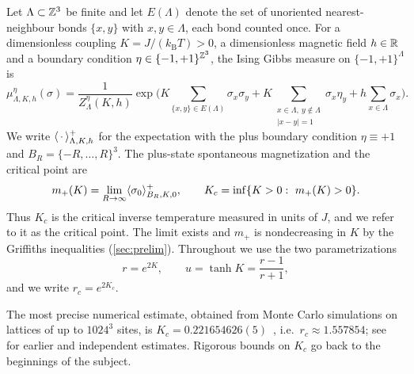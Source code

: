 Let $\Lambda\subset\mathbb Z^3$ be finite and let $E(\Lambda)$ denote the set of unoriented nearest-neighbour bonds $\{x,y\}$ with $x,y\in\Lambda$, each bond counted once. For a dimensionless coupling $K=J/(k_{\mathrm B}T)>0$, a dimensionless magnetic field $h\in\mathbb R$ and a boundary condition $\eta\in\{-1,+1\}^{\mathbb Z^3}$, the Ising Gibbs measure on $\{-1,+1\}^\Lambda$ is
\begin{equation}\label{eq:gibbs}
 \mu^{\eta}_{\Lambda,K,h}(\sigma)=\frac{1}{Z^\eta_{\Lambda}(K,h)}
 \exp\Big(K\!\!\sum_{\{x,y\}\in E(\Lambda)}\!\!\sigma_x\sigma_y
 +K\!\!\sum_{\substack{x\in\Lambda,\ y\notin\Lambda\\ |x-y|=1}}\!\!\sigma_x\eta_y
 +h\sum_{x\in\Lambda}\sigma_x\Big).
\end{equation}
We write $\langle \,\cdot\,\rangle^+_{\Lambda,K,h}$ for the expectation with the plus boundary condition $\eta\equiv+1$ and $B_R=\{-R,\dots,R\}^3$. The plus-state spontaneous magnetization and the critical point are
\begin{equation}\label{eq:Kc}
 m_+(K)=\lim_{R\to\infty}\langle \sigma_0\rangle^+_{B_R,K,0},\qquad
 K_c=\inf\{K>0:\ m_+(K)>0\}.
\end{equation}
Thus $K_c$ is the critical inverse temperature measured in units of $J$, and we refer to it as the critical point. The limit exists and $m_+$ is nondecreasing in $K$ by the Griffiths inequalities (\cref{sec:prelim}). Throughout we use the two parametrizations
\begin{equation}\label{eq:ru}
 r=e^{2K},\qquad u=\tanh K=\frac{r-1}{r+1},
\end{equation}
and we write $r_c=e^{2K_c}$.

The most precise numerical estimate, obtained from Monte Carlo simulations on lattices of up to $1024^3$ sites, is $K_c=0.221654626(5)$~\cite{FXL18}, i.e.\ $r_c\approx1.557854$; see~\cite{FL91,RBS21,PV02} for earlier and independent estimates. Rigorous bounds on $K_c$ go back to the beginnings of the subject.

